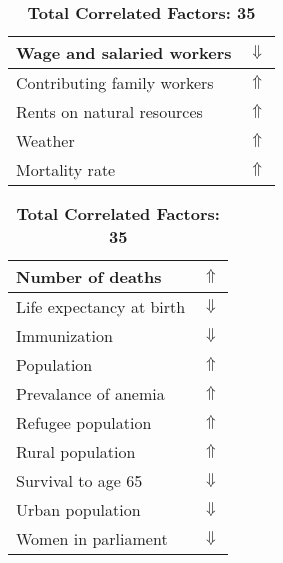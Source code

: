 \documentclass[12pt,notitlepage,oneside]{report}
\begin{document}
\begin{table}[!htb]
\begin{tabular}{|l|l|}
Wage and salaried workers & $\Downarrow$\\ \hline
Contributing family workers & $\Uparrow$\\ \hline
Rents on natural resources & $\Uparrow$\\ \hline
Weather & $\Uparrow$\\ \hline
Mortality rate & $\Uparrow$\\ \hline
\end{tabular}
\begin{tabular}{|l|l|}
\hline
Number of deaths & $\Uparrow$\\ \hline
Life expectancy at birth & $\Downarrow$\\ \hline
Immunization & $\Downarrow$\\ \hline
Population & $\Uparrow$\\ \hline
Prevalance of anemia & $\Uparrow$\\ \hline
Refugee population & $\Uparrow$\\ \hline
Rural population & $\Uparrow$\\ \hline
Survival to age 65 & $\Downarrow$\\ \hline
Urban population & $\Downarrow$\\ \hline
Women in parliament & $\Downarrow$\\ \hline
\end{tabular}
\caption*{\textbf{Total Correlated Factors: 35}}
\end{table}
\clearpage
\end{document}
